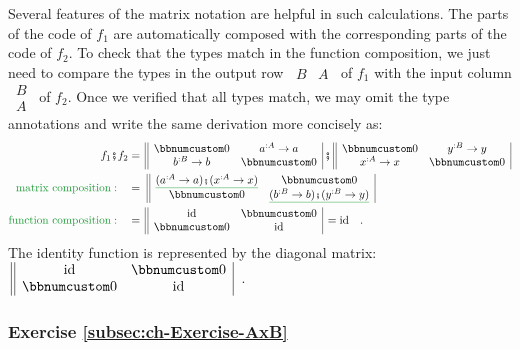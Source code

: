 Several features of the matrix notation are helpful in such calculations.
The parts of the code of $f_{1}$ are automatically composed with
the corresponding parts of the code of $f_{2}$. To check that the
types match in the function composition, we just need to compare the
types in the output row $\,\begin{array}{||cc|}
B & A\end{array}\,$ of $f_{1}$ with the input column $\,\begin{array}{|c||}
B\\
A
\end{array}\,$ of $f_{2}$. Once we verified that all types match, we may omit the
type annotations and write the same derivation more concisely as:
\begin{align*}
f_{1}\bef f_{2} & =\,\begin{array}{||cc|}
\bbnum 0 & a^{:A}\rightarrow a\\
b^{:B}\rightarrow b & \bbnum 0
\end{array}\,\bef\,\begin{array}{||cc|}
\bbnum 0 & y^{:B}\rightarrow y\\
x^{:A}\rightarrow x & \bbnum 0
\end{array}\\
{\color{greenunder}\text{matrix composition}:}\quad & =\,\,\begin{array}{||cc|}
\gunderline{(a^{:A}\rightarrow a)\bef(x^{:A}\rightarrow x)} & \bbnum 0\\
\bbnum 0 & \gunderline{(b^{:B}\rightarrow b)\bef(y^{:B}\rightarrow y)}
\end{array}\\
{\color{greenunder}\text{function composition}:}\quad & =\,\begin{array}{||cc|}
\text{id} & \bbnum 0\\
\bbnum 0 & \text{id}
\end{array}\,=\text{id}\quad.
\end{align*}
The identity function is represented by the diagonal matrix: $\,\begin{array}{||cc|}
\text{id} & \bbnum 0\\
\bbnum 0 & \text{id}
\end{array}$~.

\subsubsection{Exercise \label{subsec:ch-Exercise-AxB}\ref{subsec:ch-Exercise-AxB}}

